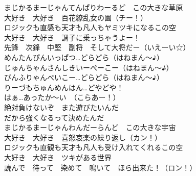 {まじかるまーじゃんてんぱりわーるど　この大きな草原\\
大好き　大好き　百花繚乱女の園（チー！）\\
ロジックも直感も天才も凡人もヤミツキになるこの空\\
大好き　大好き　調子に乗っちゃうよー！\\
先鋒　次鋒　中堅　副将　そして大将だー（いえーい☆）\\

めんたんぴんいっぱつ…どらどら（はねまん〜♪）\\
じゅんちゃんさんしきいーぺーこー（はねまん〜♪）\\
ぴんふりゃんぺいこー…どらどら（はねまん〜♪）\\
りーづもちゅんめんはん…どやどや！\\
はぁ…あったか〜い　（こらあー！）\\

絶対負けないぞ　また遊びたいんだ\\
だから強くなるって決めたんだ\\

まじかるまーじゃんわんだーらんど　この大きな宇宙\\
大好き　大好き　喜怒哀楽の繰り返し（カン！）\\
ロジックも直観も天才も凡人も受け入れてくれるこの空\\
大好き　大好き　ツキがある世界\\
読んで　待って　染めて　鳴いて　ほら出来た！（ロン！）
}

